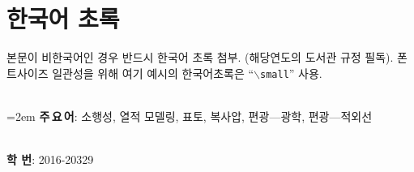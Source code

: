 \documentclass[12pt]{report}
\begin{document}
\chapter*{한국어 초록}%
{\small
\quad 본문이 비한국어인 경우 반드시 한국어 초록 첨부. (해당연도의 도서관 규정 필독). 폰트사이즈 일관성을 위해 여기 예시의 한국어초록은 ``$\backslash$\texttt{small}'' 사용.

~\\
\hangindent=2em
\textbf{주\,요\,어}: 소행성, 열적 모델링, 표토, 복사압, 편광---광학, 편광---적외선

~\\
\noindent \textbf{학 \quad 번}: 2016-20329
}


{}
\small
\footnotesize
{}
\setlength{\parskip}{0.3em}

\end{document}
